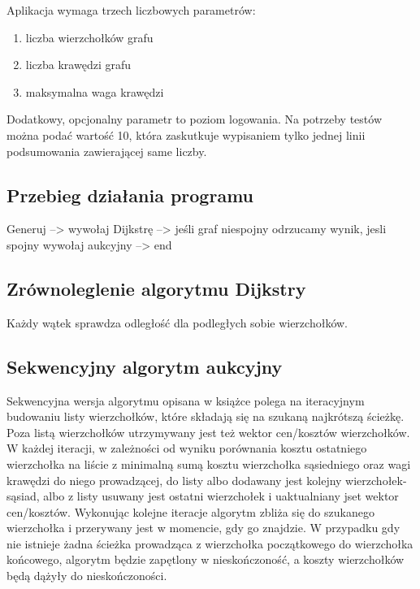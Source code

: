 \documentclass {article}
\begin{document}
Aplikacja wymaga trzech liczbowych parametrów:

\begin{enumerate}
 \item liczba wierzchołków grafu
 \item liczba krawędzi grafu
 \item maksymalna waga krawędzi
\end{enumerate}

Dodatkowy, opcjonalny parametr to poziom logowania. Na potrzeby testów można podać wartość 10, która zaskutkuje wypisaniem tylko jednej linii podsumowania zawierającej same liczby.

\subsection{Przebieg działania programu}

Generuj --> wywołaj Dijkstrę --> jeśli graf niespojny odrzucamy wynik, jesli spojny wywołaj aukcyjny --> end

\subsection{Zrównoleglenie algorytmu Dijkstry}

Każdy wątek sprawdza odległość dla podległych sobie wierzchołków.

\subsection{Sekwencyjny algorytm aukcyjny}

Sekwencyjna wersja algorytmu opisana w książce \cite{Bertsekas1998} polega na iteracyjnym budowaniu listy wierzchołków, które składają się na szukaną najkrótszą ścieżkę. Poza listą wierzchołków utrzymywany jest też wektor cen/kosztów wierzchołków. W każdej iteracji, w zależności od wyniku porównania kosztu ostatniego wierzchołka na liście z minimalną sumą kosztu wierzchołka sąsiedniego oraz wagi krawędzi do niego prowadzącej, do listy albo dodawany jest kolejny wierzchołek-sąsiad, albo z listy usuwany jest ostatni wierzchołek i uaktualniany jset wektor cen/kosztów. Wykonując kolejne iteracje algorytm zbliża się do szukanego wierzchołka i przerywany jest w momencie, gdy go znajdzie. W przypadku gdy nie istnieje żadna ścieżka prowadząca z wierzchołka początkowego do wierzchołka końcowego, algorytm będzie zapętlony w nieskończoność, a koszty wierzchołków będą dążyły do nieskończoności.
\end{document}
